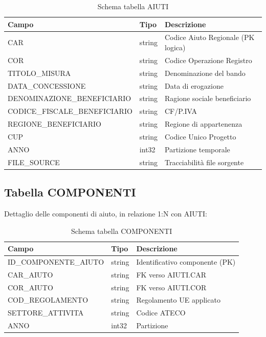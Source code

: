 \begin{table}[h]
\centering
\small
\begin{tabular}{@{}lll@{}}
\toprule
\textbf{Campo} & \textbf{Tipo} & \textbf{Descrizione} \\
\midrule
CAR & string & Codice Aiuto Regionale (PK logica) \\
COR & string & Codice Operazione Registro \\
TITOLO\_MISURA & string & Denominazione del bando \\
DATA\_CONCESSIONE & string & Data di erogazione \\
DENOMINAZIONE\_BENEFICIARIO & string & Ragione sociale beneficiario \\
CODICE\_FISCALE\_BENEFICIARIO & string & CF/P.IVA \\
REGIONE\_BENEFICIARIO & string & Regione di appartenenza \\
CUP & string & Codice Unico Progetto \\
ANNO & int32 & Partizione temporale \\
FILE\_SOURCE & string & Tracciabilità file sorgente \\
\bottomrule
\end{tabular}
\caption{Schema tabella AIUTI}
\end{table}

\subsection{Tabella COMPONENTI}

Dettaglio delle componenti di aiuto, in relazione 1:N con AIUTI:

\begin{table}[h]
\centering
\small
\begin{tabular}{@{}lll@{}}
\toprule
\textbf{Campo} & \textbf{Tipo} & \textbf{Descrizione} \\
\midrule
ID\_COMPONENTE\_AIUTO & string & Identificativo componente (PK) \\
CAR\_AIUTO & string & FK verso AIUTI.CAR \\
COR\_AIUTO & string & FK verso AIUTI.COR \\
COD\_REGOLAMENTO & string & Regolamento UE applicato \\
SETTORE\_ATTIVITA & string & Codice ATECO \\
ANNO & int32 & Partizione \\
\bottomrule
\end{tabular}
\caption{Schema tabella COMPONENTI}
\end{table}

